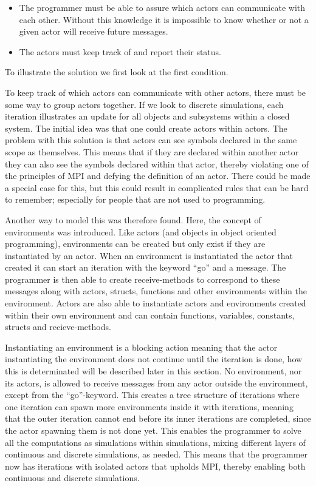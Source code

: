 \begin{itemize}
\item The programmer must be able to assure which actors can communicate with each other. Without this knowledge it is impossible to know whether or not a given actor will receive future messages.
\item The actors must keep track of and report their status.
\end{itemize} 

To illustrate the solution we first look at the first condition.

To keep track of which actors can communicate with other actors, there must be some way to group actors together. If we look to discrete simulations, each iteration illustrates an update for all objects and subsystems within a closed system. The initial idea was that one could create actors within actors. The problem with this solution is that actors can see symbols declared in the same scope as themselves. This means that if they are declared within another actor they can also see the symbols declared within that actor, thereby violating one of the principles of MPI and defying the definition of an actor. There could be made a special case for this, but this could result in complicated rules that can be hard to remember; especially for people that are not used to programming.

Another way to model this was therefore found. Here, the concept of environments was introduced. Like actors (and objects in object oriented programming), environments can be created but only exist if they are instantiated by an actor. When an environment is instantiated the actor that created it can start an iteration with the keyword \enquote{go} and a message. The programmer is then able to create receive-methods to correspond to these messages along with actors, structs, functions and other environments within the environment. Actors are also able to instantiate actors and environments created within their own environment and can contain functions, variables, constants, structs and recieve-methods. 

Instantiating an environment is a blocking action meaning that the actor instantiating the environment does not continue until the iteration is done, how this is determinated will be described later in this section. No environment, nor its actors, is allowed to receive messages from any actor outside the environment, except from the \enquote{go}-keyword. This creates a tree structure of iterations where one iteration can spawn more environments inside it with iterations, meaning that the outer iteration cannot end before its inner iterations are completed, since the actor spawning them is not done yet. This enables the programmer to solve all the computations as simulations within simulations, mixing different layers of continuous and discrete simulations, as needed. This means that the programmer now has iterations with isolated actors that upholds MPI, thereby enabling both continuous and discrete simulations.

